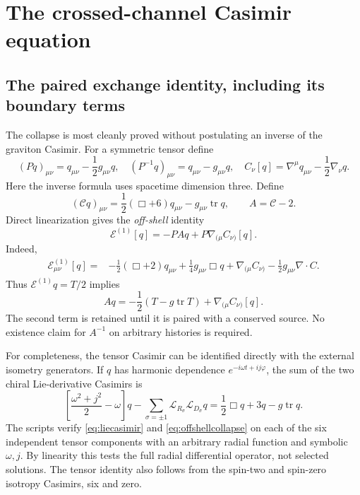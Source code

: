 \documentclass[11pt,a4paper]{article}
\numberwithin{equation}{section}
\theoremstyle{remark}\newtheorem{remark}[theorem]{Remark}
\newcommand{\tr}{\operatorname{tr}}
\newcommand{\calC}{\mathscr C}
\begin{document}
\section{The crossed-channel Casimir equation}
\label{sec:cross}

\subsection{The paired exchange identity, including its boundary terms}
\label{sec:pairedcollapse}

The collapse is most cleanly proved without postulating an inverse of the graviton Casimir. For a symmetric tensor define
\begin{equation}
 (Pq)_{\mu\nu}=q_{\mu\nu}-\frac12g_{\mu\nu}q,
 \quad (P^{-1}q)_{\mu\nu}=q_{\mu\nu}-g_{\mu\nu}q,
 \quad C_\nu[q]=\nabla^\mu q_{\mu\nu}-\frac12\nabla_\nu q.
\end{equation}
Here the inverse formula uses spacetime dimension three. Define
\begin{equation}
 (\calC q)_{\mu\nu}=\frac12(\Box+6)q_{\mu\nu}-g_{\mu\nu}\tr q,
 \qquad A=\calC-2.
 \label{eq:tensorcasimir}
\end{equation}
Direct linearization gives the \emph{off-shell} identity
\begin{equation}
 \boxed{\mathcal E^{(1)}[q]=-P A q+P\nabla_{(\mu}C_{\nu)}[q].}
 \label{eq:offshellcollapse}
\end{equation}
Indeed,
\begin{align}
 \mathcal E^{(1)}_{\mu\nu}[q]
 ={}&-\frac12(\Box+2)q_{\mu\nu}+\frac14g_{\mu\nu}\Box q
 +\nabla_{(\mu}C_{\nu)}-\frac12g_{\mu\nu}\nabla\cdot C.
\end{align}
Thus $\mathcal E^{(1)}q=T/2$ implies
\begin{equation}
 \boxed{Aq=-\frac12(T-g\tr T)+\nabla_{(\mu}C_{\nu)}[q].}
 \label{eq:collapsewithgauge}
\end{equation}
The second term is retained until it is paired with a conserved source. No existence claim for $A^{-1}$ on arbitrary histories is required.

For completeness, the tensor Casimir can be identified directly with the external isometry generators. If $q$ has harmonic dependence $e^{-i\omega t+ij\varphi}$, the sum of the two chiral Lie-derivative Casimirs is
\begin{equation}
 \left[\frac{\omega^2+j^2}{2}-\omega\right]q
 -\sum_{\sigma=\pm1}\mathcal L_{R_\sigma}\mathcal L_{D_\sigma}q
 =\frac12\Box q+3q-g\tr q.
 \label{eq:liecasimir}
\end{equation}
The scripts verify \eqref{eq:liecasimir} and \eqref{eq:offshellcollapse} on each of the six independent tensor components with an arbitrary radial function and symbolic $\omega,j$. By linearity this tests the full radial differential operator, not selected solutions. The tensor identity also follows from the spin-two and spin-zero isotropy Casimirs, six and zero.
\end{document}
